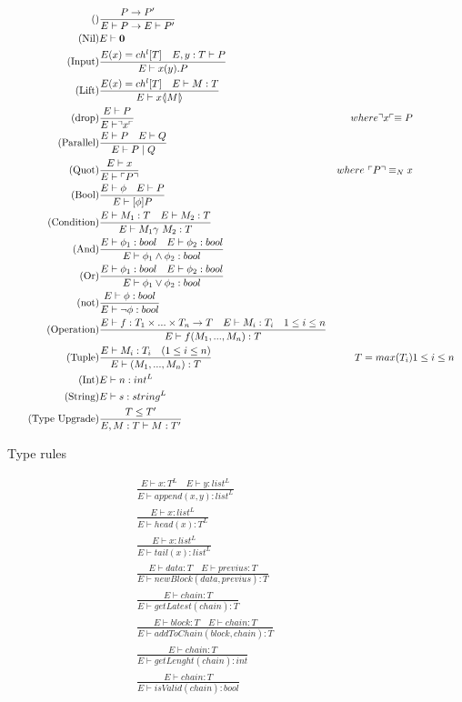 \begin{figure}
\begin{align}
\tag{} & \frac{P\rightarrow P'}{E\vdash P \rightarrow E\vdash P'}\\
\tag{Nil} &E \vdash \mathbf{0}\\
\tag{Input} &\frac{E(x) = ch^l[T]\quad E,y:T\vdash P}{E \vdash x(y).P}\\
\tag{Lift} &\frac{E(x) = ch^l[T] \quad E \vdash M:T}{E\vdash x \langle \! | M | \! \rangle}\\
\tag{drop} &\frac{E \vdash P}{E\vdash \urcorner x \ulcorner}& where \urcorner x \ulcorner \equiv P\\
\tag{Parallel} &\frac{E\vdash P \quad E \vdash Q}{E \vdash P \mid Q}\\
\tag{Quot} &\frac{E \vdash x}{E\vdash \ulcorner P \urcorner}& where\ \ulcorner P \urcorner \equiv_N x\\
\tag{Bool} &\frac{E\vdash \phi \quad E\vdash P}{E \vdash [\phi] P}\\
\tag{Condition} &\frac{E\vdash M_1:T \quad E\vdash M_2:T}{E\vdash M_1 \gamma\ M_2:T}\\
\tag{And} &\frac{E\vdash \phi _1:bool \quad E\vdash \phi _2:bool}{E\vdash \phi _1 \land \phi _2:bool}\\
\tag{Or} &\frac{E\vdash \phi _1:bool \quad E\vdash \phi _2:bool}{E\vdash \phi _1 \lor \phi _2:bool}\\
\tag{not} &\frac{E\vdash \phi :bool }{E\vdash \neg \phi :bool}\\
\tag{Operation} &\frac{E\vdash f:T_1\times ... \times T_n\rightarrow T\quad E\vdash M_i:T_i\quad 1\leq i \leq n}{E\vdash f(M_1,...,M_n):T}\\
\tag{Tuple} &\frac{E\vdash M_i:T_i \quad (1\leq i\leq n)}{E\vdash (M_1,...,M_n):T}&T = max(T_i)& 1\leq i\leq n\\
\tag{Int} &E\vdash n: int^L\\
\tag{String} &E\vdash s:string^L\\
\tag{Type Upgrade} &\frac{T\leq T'}{E, M:T\vdash M:T'}
\end{align}
\caption{Type rules}
\label{fig:typerules}
\end{figure}

\begin{align}
\tag{Append} &\frac{E \vdash x:T^L \quad E \vdash y:list^L}{E \vdash append(x,y):list^L}\\
\tag{Head} &\frac{E \vdash x:list^L}{E \vdash head(x):T^L}\\
\tag{Tail} &\frac{E \vdash x:list^L}{E \vdash tail(x):list^L}\\
\tag{newBlock}& \frac{E \vdash data:T \quad E \vdash previus : T}{E \vdash newBlock(data, previus) :T}\\
\tag{getLatest}& \frac{E \vdash chain :T}{E \vdash getLatest(chain):T}\\
\tag{addToChain}& \frac{E \vdash block:T \quad E \vdash chain:T}{E \vdash addToChain(block, chain):T}\\
\tag{getLenght}& \frac{E \vdash chain:T}{E \vdash getLenght(chain):int}\\
\tag{isValid}& \frac{E \vdash chain:T}{E \vdash isValid(chain):bool}
\end{align}

